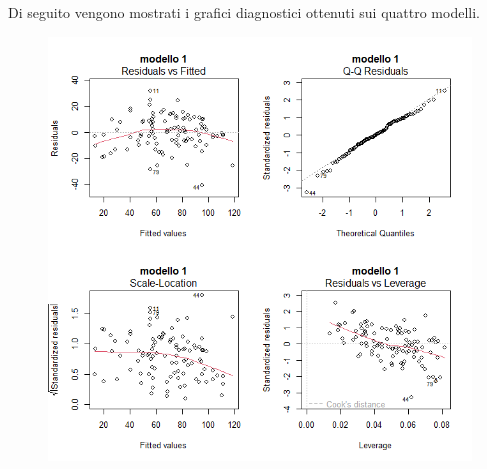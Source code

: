 Di seguito vengono mostrati i grafici diagnostici ottenuti sui quattro modelli.
\begin{figure}[H]
	\centering
	\includegraphics[width=0.75\linewidth]{../graphs/diagnostica/diagnostica_ridotto}
	\label{fig:diagnosticaridotto}
\end{figure}
